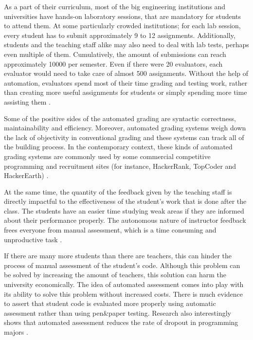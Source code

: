 \documentclass[a4paper, 12pt]{article}
\begin{document}
    As a part of their curriculum, most of the big engineering institutions and universities have hands-on laboratory sessions, that are mandatory
    for students to attend them. At some particularly crowded institutions; for each lab session, every student has to submit approximately 9 to 12 assignments. 
    Additionally, students and the teaching staff alike may also need to deal with lab tests, perhaps even multiple of them. 
    Cumulatively, the amount of submissions can reach approximately 10000 per semester. 
    Even if there were 20 evaluators, each evaluator would need to take care of almost 500 assignments.
    Without the help of automation, evaluators spend most of their time grading and testing work, rather than creating more useful assignments for students 
    or simply spending more time assisting them \cite{Mandal2007}.

    Some of the positive sides of the automated grading are syntactic correctness, maintainability and efficiency.
    Moreover, automated grading systems weigh down the lack of objectivity in conventional grading and these systems
    can track all of the building process. In the contemporary context, these kinds of automated grading systems are commonly used by
    some commercial competitive programming and recruitment sites (for instance, HackerRank, TopCoder and HackerEarth) \cite{RestrepoCalle2018}.

    At the same time, the quantity of the feedback given by the teaching staff is directly impactful to the effectiveness of the student's work that is done
    after the class. The students have an easier time studying weak areas if they are informed about their
    performance properly. The autonomous nature of instructor feedback frees everyone from manual assessment,
    which is a time consuming and unproductive task \cite{RestrepoCalle2018-2}.

    If there are many more students than there are teachers, this can hinder the process of manual assessment of the student's code.
    Although this problem can be solved by increasing the amount of teachers, this solution can harm the university economically.
    The idea of automated assessment comes into play with its ability to solve this problem without increased costs.
    There is much evidence to assert that student code is evaluated more properly using automatic assessment rather than using pen\&paper testing.
    Research also interestingly shows that automated assessment reduces the rate of dropout in programming majors \cite{Gordillo2019}.
\end{document}
